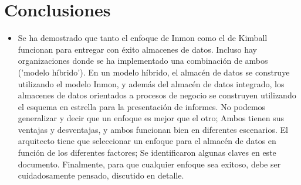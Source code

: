 \documentclass[twoside,twocolumn]{article}
\begin{document}

\section{Conclusiones}
\begin{itemize}	
\item
Se ha demostrado que tanto el enfoque de Inmon como el de Kimball funcionan para entregar con éxito almacenes de datos. Incluso hay organizaciones donde se ha implementado una combinación de ambos ('modelo híbrido'). En un modelo híbrido, el almacén de datos se construye utilizando el modelo Inmon, y además del almacén de datos integrado, los almacenes de datos orientados a procesos de negocio se construyen utilizando el esquema en estrella para la presentación de informes. No podemos generalizar y decir que un enfoque es mejor que el otro; Ambos tienen sus ventajas y desventajas, y ambos funcionan bien en diferentes escenarios. El arquitecto tiene que seleccionar un enfoque para el almacén de datos en función de los diferentes factores; Se identificaron algunas claves en este documento. Finalmente, para que cualquier enfoque sea exitoso, debe ser cuidadosamente pensado, discutido en detalle.
\end{itemize} 



\end{document}
